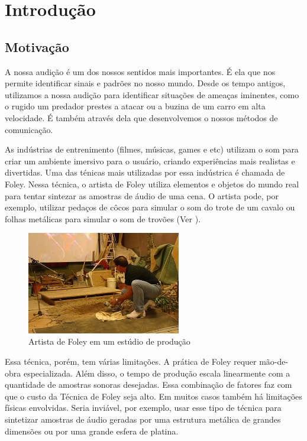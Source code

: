\chapter{Introdução}

\section{Motivação}

A nossa audição é um dos nossos sentidos mais importantes. É ela que nos permite identificar sinais e padrões no nosso mundo. Desde os tempo antigos, utilizamos a nossa audição para identificar situações de ameaças iminentes, como o rugido um predador prestes a atacar ou a buzina de um carro em alta velocidade. É também através dela que desenvolvemos o nossos métodos de comunicação.

As indústrias de entrenimento (filmes, músicas, games e etc) utilizam o som para criar um ambiente imersivo para o usuário, criando experiências mais realistas e divertidas. Uma das ténicas mais utilizadas por essa indústrica é chamada de Foley. Nessa técnica, o artista de Foley utiliza elementos e objetos do mundo real para tentar sintezar as amostras de áudio de uma cena. O artista pode, por exemplo, utilizar pedaços de côcos para simular o som do trote de um cavalo \cite{bonebright2012were} ou folhas metálicas para simular o som de trovões (Ver ).

\begin{figure}[ht]
	\centering
	\includegraphics[width=0.6\textwidth]{introduction/foley.jpg}
	\caption[Artista de Foley em um estúdio de produção]{Artista de Foley em um estúdio de produção\footnotemark}\label{fig:foley}
\end{figure}


Essa técnica, porém, tem várias limitações. A prática de Foley requer mão-de-obra especializada. Além disso, o tempo de produção escala linearmente com a quantidade de amostras sonoras desejadas. Essa combinação de fatores faz com que o custo da Técnica de Foley seja alto. Em muitos casos também há limitações físicas envolvidas. Seria inviável, por exemplo, usar esse tipo de técnica para sintetizar amostras de áudio geradas por uma estrutura metálica de grandes dimensões ou por uma grande esfera de platina.

